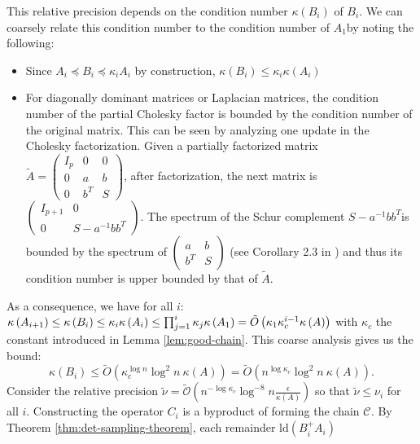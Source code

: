 This relative precision depends on the condition number $\kappa\left(B_{i}\right)$
of $B_{i}$. We can coarsely relate this condition number to the condition
number of $A_{1}$by noting the following: 
\begin{itemize}
\item Since $A_{i}\preceq B_{i}\preceq\kappa_{i}A_{i}$ by construction,
$\kappa\left(B_{i}\right)\leq\kappa_{i}\kappa\left(A_{i}\right)$ 
\item For diagonally dominant matrices or Laplacian matrices, the condition
number of the partial Cholesky factor is bounded by the condition
number of the original matrix. This can be seen by analyzing one update
in the Cholesky factorization. Given a partially factorized matrix
$\tilde{A}=\left(\begin{array}{ccc}
I_{p} & 0 & 0\\
0 & a & b\\
0 & b^{T} & S
\end{array}\right)$, after factorization, the next matrix is $\left(\begin{array}{cc}
I_{p+1} & 0\\
0 & S-a^{-1}bb^{T}
\end{array}\right)$. The spectrum of the Schur complement $S-a^{-1}bb^{T}$is bounded
by the spectrum of $\left(\begin{array}{cc}
a & b\\
b^{T} & S
\end{array}\right)$ (see Corollary 2.3 in \cite{Zhang2005}) and thus its condition number
is upper bounded by that of $\tilde{A}$. 
\end{itemize}
As a consequence, we have for all $i$: $\kappa\left(A_{i+1}\right)\leq\kappa\left(B_{i}\right)\leq\kappa_{i}\kappa\left(A_{i}\right)\leq\prod_{j=1}^{i}\kappa_{j}\kappa\left(A_{1}\right) \\*=\tilde{O}\left(\kappa_{1}\kappa_{c}^{i-1}\kappa\left(A\right)\right)$
with $\kappa_{c}$ the constant introduced in Lemma \ref{lem:good-chain}.
This coarse analysis gives us the bound: 
\[
\kappa\left(B_{i}\right)\leq\tilde{O}\left(\kappa_{c}^{\log n}\log^{2}n~\kappa\left(A\right)\right)=\tilde{O}\left(n^{\log\kappa_{c}}\log^{2}n\ \kappa\left(A\right)\right).
\]
Consider the relative precision $\tilde{\nu}=\tilde{\mathcal{O}}\left(n^{-\log\kappa_{c}}\log^{-8}n\frac{\epsilon}{\kappa\left(A\right)}\right)$
so that $\tilde{\nu}\leq\nu_{i}$ for all $i$. Constructing the operator
$C_{i}$ is a byproduct of forming the chain \emph{$\mathcal{C}$.
}By Theorem \ref{thm:det-sampling-theorem}, each remainder $\text{ld}\left(B_{i}^{+}A_{i}\right)$
